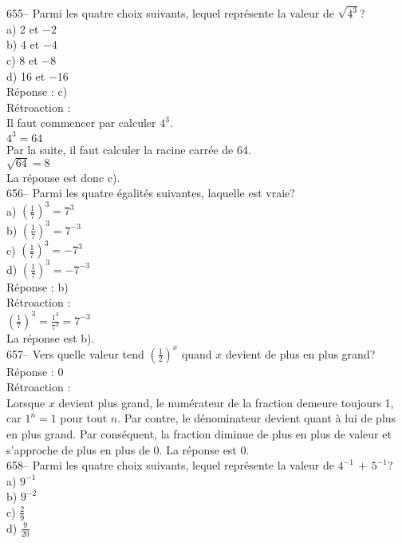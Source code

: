 ﻿\documentclass[letterpaper, 12pt]{article}
\begin{document}
655-- Parmi les quatre choix suivants, lequel repr\'esente la valeur de
$\sqrt{4^{3}}$?\\
a) 2 et $-2$\\
b) 4 et $-4$\\
c) 8 et $-8$\\
d) 16 et $-16$\\

R\'eponse : c)\\

R\'etroaction : \\
Il faut commencer par calculer $4^{3}$.\\
$4^{3}=64$\\
Par la suite, il faut calculer la racine carr\'ee de 64.\\
$\sqrt{64}= 8$\\
La r\'eponse est donc c).\\

656-- Parmi les quatre \'egalit\'es suivantes, laquelle est vraie?\\
a) $(\frac{1}{7})^{3}=7^{3}$\\[2mm]
b) $(\frac{1}{7})^{3}=7^{-3}$\\[2mm]
c) $(\frac{1}{7})^{3}=-7^{3}$\\[2mm]
d) $(\frac{1}{7})^{3}=-7^{-3}$\\

R\'eponse : b)\\

R\'etroaction : \\[2mm]
$(\frac{1}{7})^{3}=\frac{1^{3}}{7^{3}}=7^{-3}$\\[2mm]
La r\'eponse est b).\\

657-- Vers quelle valeur tend $\left(\frac12\right)^x$ quand $x$
devient de plus
en plus grand?\\

R\'eponse : 0\\

R\'etroaction : \\
Lorsque $x$ devient plus grand, le num\'erateur de la fraction demeure
toujours 1, car $1^{n}=1$ pour tout $n$.  Par contre, le d\'enominateur
devient quant \`a lui de plus en plus grand.  Par cons\'equent, la fraction
diminue de plus en plus de valeur et s'approche de plus en plus de 0.  La
r\'eponse est 0.  \\

658-- Parmi les quatre choix suivants, lequel repr\'esente la valeur de
$4^{-1}\,+\,5^{-1}$?\\
a) $9^{-1}$\\[2mm]
b) $9^{-2}$\\[2mm]
c) $\frac{2}{9}$\\[2mm]
d) $\frac{9}{20}$\\
\end{document}
